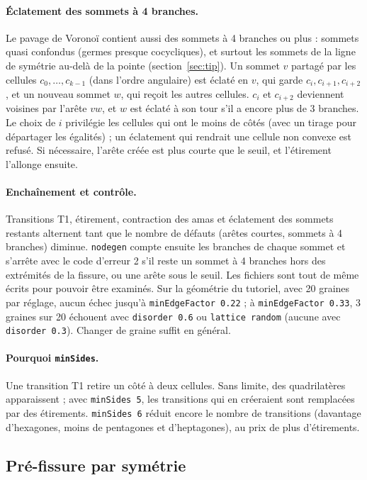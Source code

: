\documentclass[11pt,a4paper]{article}
\newcommand{\code}[1]{\texttt{#1}}
\newcommand{\toolgen}{\code{nodegen}}
\begin{document}
\paragraph{Éclatement des sommets à 4 branches.} Le pavage de Voronoï contient aussi des sommets à 4 branches
ou plus : sommets quasi confondus (germes presque cocycliques), et surtout les sommets de la ligne de symétrie
au-delà de la pointe (section~\ref{sec:tip}). Un sommet $v$ partagé par les cellules $c_0,\dots,c_{k-1}$ (dans
l'ordre angulaire) est éclaté en $v$, qui garde $c_i, c_{i+1}, c_{i+2}$, et un nouveau sommet $w$, qui reçoit les
autres cellules. $c_i$ et $c_{i+2}$ deviennent voisines par l'arête $vw$, et $w$ est éclaté à son tour s'il a
encore plus de 3 branches. Le choix de $i$ privilégie les cellules qui ont le moins de côtés (avec un tirage pour
départager les égalités) ; un éclatement qui rendrait une cellule non convexe est refusé. Si nécessaire,
l'arête créée est plus courte que le seuil, et l'étirement l'allonge ensuite.

\paragraph{Enchaînement et contrôle.} Transitions T1, étirement, contraction des amas et éclatement des sommets
restants alternent tant que le nombre de défauts (arêtes courtes, sommets à 4 branches) diminue. \toolgen{} compte
ensuite les branches de chaque sommet et s'arrête avec le code d'erreur 2 s'il reste un sommet à 4 branches hors
des extrémités de la fissure, ou une arête sous le seuil. Les fichiers sont tout de même écrits pour pouvoir être
examinés. Sur la géométrie du tutoriel, avec 20 graines par réglage, aucun échec jusqu'à
\code{minEdgeFactor 0.22} ; à \code{minEdgeFactor 0.33}, 3 graines sur 20 échouent avec \code{disorder 0.6} ou
\code{lattice random} (aucune avec \code{disorder 0.3}). Changer de graine suffit en général.

\paragraph{Pourquoi \code{minSides}.} Une transition T1 retire un côté à deux cellules. Sans limite, des
quadrilatères apparaissent ; avec \code{minSides 5}, les transitions qui en créeraient sont remplacées par des
étirements. \code{minSides 6} réduit encore le nombre de transitions (davantage d'hexagones, moins de pentagones et
d'heptagones), au prix de plus d'étirements.

\subsection{Pré-fissure par symétrie}
\label{sec:crack}
\end{document}
